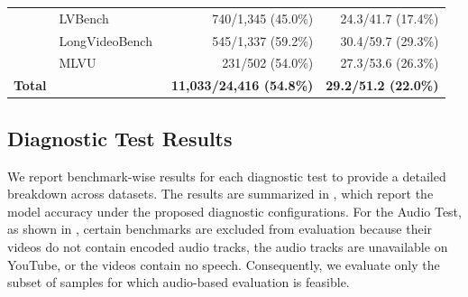 \begin{table}[h]
{\begin{tabular}{llrr}
        & LVBench~\cite{lvbench}               & 740/1,345 (45.0\%)   & 24.3/41.7 (17.4\%) \\
        & LongVideoBench~\cite{longvideobench} & 545/1,337 (59.2\%)   & 30.4/59.7 (29.3\%) \\
        & MLVU~\cite{mlvu}                     & 231/502 (54.0\%)     & 27.3/53.6 (26.3\%) \\
        \midrule
        \rowcolor{gray!10}
        \textbf{Total} & & \textbf{11,033/24,416 (54.8\%)} & \textbf{29.2/51.2 (22.0\%)} \\
        \bottomrule
        \end{tabular}}
        \vspace{-8mm}
        \end{table}

    \subsection{Diagnostic Test Results} \label{sec:b.2}
        We report benchmark-wise results for each diagnostic test to provide a detailed breakdown across datasets. 
        The results are summarized in , which report the model accuracy under the proposed diagnostic configurations.
        For the Audio Test, as shown in , certain benchmarks are excluded from evaluation because their videos do not contain encoded audio tracks, the audio tracks are unavailable on YouTube, or the videos contain no speech. 
        Consequently, we evaluate only the subset of samples for which audio-based evaluation is feasible.    
                
